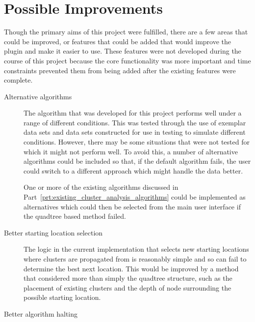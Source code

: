 
\section{Possible Improvements}
\label{sec:possible_improvements}

Though the primary  aims of this project were fulfilled, there are a few areas
that could be improved, or features that could be added that would improve the
plugin and make it easier to use. These features were not developed during the
course of this project because the core functionality was more important and
time constraints prevented them from being added after the existing features
were complete.

\begin{description}

	\item[Alternative algorithms] \hfill

		The algorithm that was developed for this project performs well under a
		range of different conditions. This was tested through the use of
		exemplar data sets and data sets constructed for use in testing to
		simulate different conditions. However, there may be some situations
		that were not tested for which it might not perform well. To avoid
		this, a number of alternative algorithms could be included so that, if
		the default algorithm fails, the user could switch to a different
		approach which might handle the data better.

		One or more of the existing algorithms discussed in
		Part~\ref{prt:existing_cluster_analysis_algorithms} could be
		implemented as alternatives which could then be selected from the main
		user interface if the quadtree based method failed.

	\item[Better starting location selection] \hfill

		The logic in the current implementation that selects new starting
		locations where clusters are propagated from is reasonably simple and
		so can fail to determine the best next location. This would be improved
		by a method that considered more than simply the quadtree structure,
		such as the placement of existing clusters and the depth of node
		surrounding the possible starting location.

	\item[Better algorithm halting] \hfill


\end{description}
